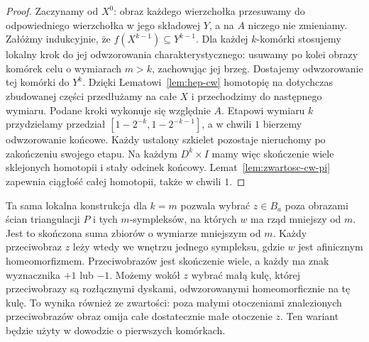 \begin{proof}
Zaczynamy od $X^0$:
obraz każdego wierzchołka
przesuwamy do odpowiedniego
wierzchołka w jego składowej
$Y$, a na $A$ niczego
nie zmieniamy. Załóżmy
indukcyjnie, że
$f(X^{k-1})\subseteq Y^{k-1}$.
Dla każdej $k$-komórki
stosujemy lokalny krok
do jej odwzorowania
charakterystycznego:
usuwamy po kolei obrazy
komórek celu o wymiarach
$m>k$, zachowując
jej brzeg. Dostajemy
odwzorowanie tej komórki do
$Y^k$. Dzięki
Lematowi~\ref{lem:hep-cw}
homotopię na dotychczas
zbudowanej części
przedłużamy na całe $X$
i przechodzimy do
następnego wymiaru.
Podane kroki wykonuje
się względnie $A$.
Etapowi wymiaru $k$ przydzielamy przedział
$[1-2^{-k},1-2^{-k-1}]$, a w chwili $1$ bierzemy odwzorowanie końcowe.
Każdy ustalony szkielet pozostaje nieruchomy po zakończeniu swojego etapu.
Na każdym $D^k\times I$ mamy więc skończenie wiele sklejonych homotopii
i stały odcinek końcowy. Lemat~\ref{lem:zwartosc-cw-pi}
zapewnia ciągłość całej homotopii, także w chwili $1$.
\end{proof}

\begin{uwaga}
\label{rem:przyblizenie-rowne-wymiary}
Ta sama lokalna konstrukcja dla $k=m$ pozwala wybrać $z\in B_a$
poza obrazami ścian triangulacji $P$ i tych $m$-sympleksów,
na których $w$ ma rząd mniejszy od $m$. Jest to skończona suma
zbiorów o wymiarze mniejszym od $m$. Każdy przeciwobraz $z$
leży wtedy we wnętrzu jednego sympleksu, gdzie $w$ jest afinicznym homeomorfizmem.
Przeciwobrazów jest skończenie wiele, a każdy ma znak wyznacznika $+1$ lub $-1$.
Możemy wokół $z$ wybrać małą kulę, której przeciwobrazy są rozłącznymi
dyskami, odwzorowanymi homeomorficznie na tę kulę.
To wynika również ze zwartości: poza małymi otoczeniami znalezionych
przeciwobrazów obraz omija całe dostatecznie małe otoczenie $z$.
Ten wariant będzie użyty w dowodzie o pierwszych komórkach.
\end{uwaga}


